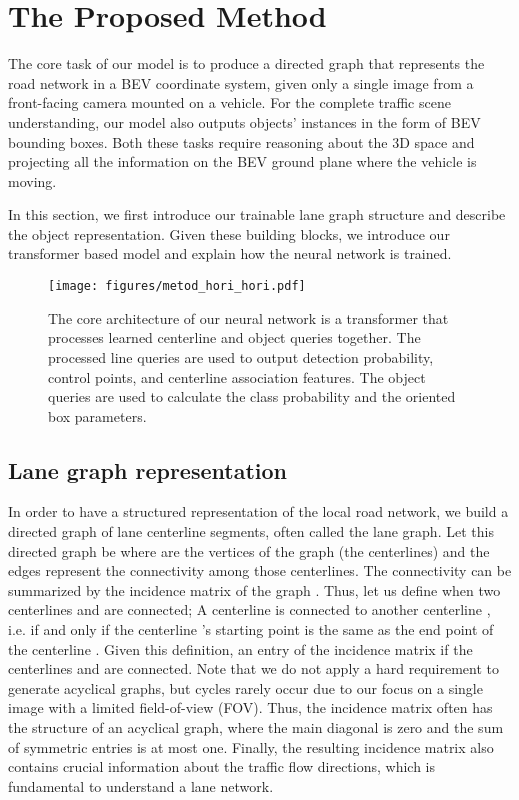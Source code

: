 \documentclass[10pt,twocolumn,letterpaper]{article}
\begin{document}
\section{The Proposed Method}
The core task of our model is to produce a directed graph that represents the road network in a BEV coordinate system, given only a single image from a front-facing camera mounted on a vehicle. For the complete traffic scene understanding, our model also outputs  objects' instances in the form of BEV bounding boxes. Both these tasks require reasoning about the 3D space and projecting all the information on the BEV ground plane where the vehicle is moving.

In this section, we first introduce our trainable lane graph structure and describe the object representation. Given these building blocks, we introduce our transformer based model and explain how the neural network is trained. 










\begin{figure*}
    \centering
    \texttt{[image: figures/metod\_hori\_hori.pdf]}
    \caption{The core architecture of our neural network is a transformer \cite{DBLP:conf/eccv/CarionMSUKZ20} that processes learned centerline and object queries together. The processed line queries are used to output detection probability, control points, and centerline association features. The object queries are used to calculate the class probability and the oriented box parameters.}
    \label{fig:temp_net}
    \vspace{-1em}
\end{figure*}

\subsection{Lane graph representation}
In order to have a structured representation of the local road network, we build a directed graph of lane centerline segments, often called the lane graph. Let this directed graph be  where  are the vertices of the graph (the centerlines) and the edges  represent the connectivity among those centerlines. The connectivity can be summarized by the incidence matrix  of the graph . Thus, let us define when two centerlines  and  are connected; A centerline  is connected to another centerline , i.e.  if and only if the centerline 's starting point is the same as the end point of the centerline . Given this definition, an entry of the incidence matrix  if the centerlines  and  are connected. Note that we do not apply a hard requirement to generate acyclical graphs, but cycles rarely occur due to our focus on a single image with a limited field-of-view (FOV). Thus, the incidence matrix often has the structure of an acyclical graph, where the main diagonal is zero and the sum of symmetric entries is at most one. Finally, the resulting incidence matrix also contains crucial information about the traffic flow directions, which is fundamental to understand a lane network.
\end{document}
